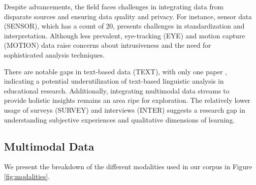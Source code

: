 \documentclass[manuscript,screen,review]{acmart}
\begin{document}
Despite advancements, the field faces challenges in integrating data from disparate sources and ensuring data quality and privacy. For instance, sensor data (SENSOR), which has a count of 20, presents challenges in standardization and interpretation. Although less prevalent, eye-tracking (EYE) and motion capture (MOTION) data raise concerns about intrusiveness and the need for sophisticated analysis techniques.

There are notable gaps in text-based data (TEXT), with only one paper \cite{666050348}, indicating a potential underutilization of text-based linguistic analysis in educational research. Additionally, integrating multimodal data streams to provide holistic insights remains an area ripe for exploration. The relatively lower usage of surveys (SURVEY) and interviews (INTER) suggests a research gap in understanding subjective experiences and qualitative dimensions of learning.


\subsection{Multimodal Data}
We present the breakdown of the different modalities used in our corpus in Figure \ref{fig:modalities}.
\end{document}
